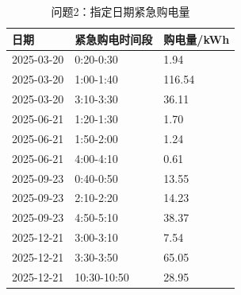 \begin{table}[H]\centering\scriptsize
\caption{问题2：指定日期紧急购电量}
\begin{tabular}{lll}\toprule 日期&紧急购电时间段&购电量/kWh\\\midrule
2025-03-20&0:20-0:30&1.94\\
2025-03-20&1:00-1:40&116.54\\
2025-03-20&3:10-3:30&36.11\\
2025-06-21&1:20-1:30&1.70\\
2025-06-21&1:50-2:00&1.24\\
2025-06-21&4:00-4:10&0.61\\
2025-09-23&0:40-0:50&13.55\\
2025-09-23&2:10-2:20&14.23\\
2025-09-23&4:50-5:10&38.37\\
2025-12-21&3:00-3:10&7.54\\
2025-12-21&3:30-3:50&65.05\\
2025-12-21&10:30-10:50&28.95\\
\bottomrule\end{tabular}\end{table}

